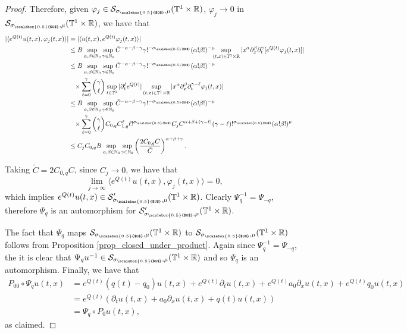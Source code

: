 \documentclass[11pt,reqno]{amsart}
\numberwithin{equation}{section}
\theoremstyle{definition}
\theoremstyle{definition}
\newcommand{\T}{\mathbb{T}}
\newcommand{\R}{\mathbb{R}}
\newcommand{\N}{\mathbb{N}}
\newcommand{\g}{\mathbb{T}^1\times\mathbb{R}}
\newcommand{\scoef}{\mathcal{S}_{\sigma_{\scalebox{0.5}{$0$}},\mu}(\g)}
\newcommand{\sscoef}{\mathcal{S}'_{\sigma_{\scalebox{0.5}{$0$}},\mu}(\g)}
\newcommand{\sigmac}{\sigma_{\scalebox{0.5}{$0$}}}
\begin{document}
\begin{proof}
    Therefore, given $\varphi_j\in\scoef$, $\varphi_j\to0$ in $\scoef$, we have that
    \begin{align*}
        |\langle e^{Q(t)}{u}(t,x),\varphi_j(t,x)\rangle|&=|\langle {u}(t,x),e^{Q(t)}\varphi_j(t,x)
        \rangle|\\
        & \leq B\sup_{\alpha,\beta\in\N_0}\sup_{\gamma\in\N_0} \tilde C^{-\alpha-\beta-\gamma}\gamma!^{-\sigmac}(\alpha!\beta!)^{-\mu}\!\!\!\sup_{(t,x)\in\T^1\times\R}|x^{\alpha}\partial_x^{\beta}\partial_t^{\gamma}[e^{Q(t)}\varphi_j(t,x)]|\\
        &\leq B\sup_{\alpha,\beta\in\N_0}\sup_{\gamma\in\N_0} \tilde C^{-\alpha-\beta-\gamma}\gamma!^{-\sigmac}(\alpha!\beta!)^{-\mu}\\
        &\phantom{\leq} \times\sum_{\ell=0}^\gamma \binom{\gamma}{\ell}\sup_{t\in\T^1}|\partial_t^{\ell }e^{Q(t)}|\sup_{(t,x)\in\T^1\times\R}|x^{\alpha}\partial_x^{\beta}\partial_t^{\gamma-\ell}\varphi_j(t,x)|\\
        &\leq B\sup_{\alpha,\beta\in\N_0}\sup_{\gamma\in\N_0} \tilde C^{-\alpha-\beta-\gamma}\gamma!^{-\sigmac}(\alpha!\beta!)^{-\mu}\\
         &\phantom{\leq} \times\sum_{\ell=0}^\gamma \binom{\gamma}{\ell} C_{0,q}C_{1,q}^\ell \ell!^{\sigmac}C_j {C}^{\alpha+\beta+(\gamma-\ell)}(\gamma-\ell)!^{\sigmac}(\alpha!\beta!)^{\mu}\\
         &\leq C_jC_{0,q}B\sup_{\alpha,\beta\in\N_0}\sup_{\gamma\in\N_0}\left(\frac{2C_{0,q}C}{\tilde C}\right)^{\alpha+\beta+\gamma}.
    \end{align*}
    
    Taking $\tilde C=2C_{0,q}C$, since $C_j\to 0$, we have that
    \[\lim_{j\to\infty}\langle e^{Q(t)}u(t,x),\varphi_j(t,x)\rangle=0,\]
    which implies $e^{Q(t)}u(t,x)\in\sscoef$. Clearly $\Psi_q^{-1}=\Psi_{-q}$, therefore $\Psi_q$ is an automorphism for $\sscoef$. 
    
    The fact that $\Psi_q$ maps $\scoef$ to $\scoef$ follows from Proposition \ref{prop_closed_under_product}. Again since $\Psi_q^{-1}=\Psi_{-q}$, the it is clear that $\Psi_qu^{-1}\in\scoef$ and so $\Psi_q$ is an automorphism. Finally, we have that 
     \begin{align*}
         P_{00}\circ\Psi_q u(t,x)&=e^{Q(t)}(q(t)-q_0)u(t,x)+e^{Q(t)}\partial_tu(t,x)+e^{Q(t)}a_0\partial_xu(t,x)+e^{Q(t)}q_0u(t,x)\\
         &=e^{Q(t)}(\partial_tu(t,x)+a_0\partial_xu(t,x)+q(t)u(t,x))\\
         &=\Psi_q\circ P_0 u(t,x),
     \end{align*}
     as claimed.
\end{proof}
\end{document}
